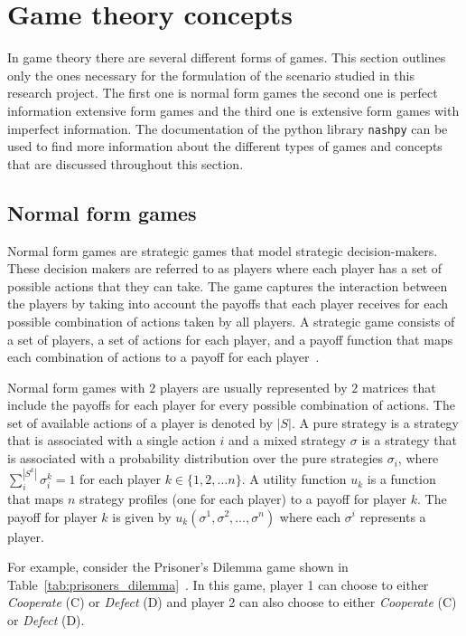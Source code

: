 \section{Game theory concepts}\label{sec:game_theory_intro}

In game theory there are several different forms of games.
This section outlines only the ones necessary for the formulation
of the scenario studied in this research project.
The first one is normal form games the second one is perfect information
extensive form games and the third one is extensive form games with imperfect
information.
The documentation of the python library \texttt{nashpy} can
be used to find more information about the different types of games and concepts
that are discussed throughout this section.


\subsection{Normal form games}\label{sec:game_intro_normal_form_games}

Normal form games are strategic games that model strategic decision-makers.
These decision makers are referred to as players where each player has a
set of possible actions that they can take.
The game captures the interaction between the players by taking into account
the payoffs that each player receives for each possible combination of actions
taken by all players.
A strategic game consists of a set of players, a set of actions for each player,
and a payoff function that maps each combination of actions to a payoff for
each player~\cite{osborne2004_normal_form_games}.

Normal form games with \(2\) players are usually represented by \(2\)
matrices that include the payoffs for each player for every possible combination
of actions.
The set of available actions of a player is denoted by \(|S|\).
A pure strategy is a strategy that is associated with a single action \(i\) and
a mixed strategy \(\sigma\) is a strategy that is associated with a probability
distribution over the pure strategies \(\sigma_i\),
where \(\sum_i^{|S^k|}\sigma_i^k = 1\) for each player
\(k \in \{1,2,\dots n\}\).
A utility function \(u_k\) is a function that maps \(n\) strategy profiles (one
for each player) to a payoff for player \(k\).
The payoff for player \(k\) is given by \(u_k(\sigma^1, \sigma^2, \dots,
\sigma^n)\) where each \(\sigma^i\) represents a player. 

For example, consider the Prisoner's Dilemma game shown in
Table~\ref{tab:prisoners_dilemma}~\cite{glynatsi2021bibliometric}.
In this game, player 1 can choose to either \textit{Cooperate} (C) or
\textit{Defect} (D) and player 2 can also choose to either \textit{Cooperate}
(C) or \textit{Defect} (D).

